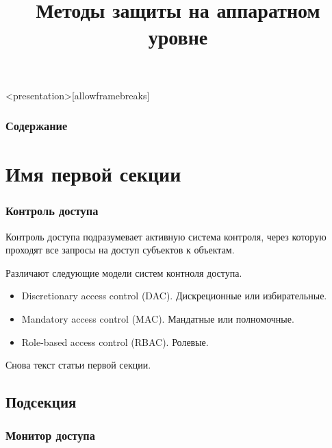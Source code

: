 
\title[Методы аппаратной защиты]{Методы защиты на аппаратном уровне}






\begin{frame}<presentation>[allowframebreaks]
\frametitle{Содержание}
\tableofcontents
\end{frame}


\section{Имя первой секции}



\begin{frame}
\frametitle{Контроль доступа}
\begin{definition}%
\alert{Контроль доступа} подразумевает активную система контроля, через которую проходят все запросы на доступ субъектов к объектам.
\end{definition}
Различают следующие модели систем контноля доступа.
\begin{itemize}
    \item Discretionary access control (DAC). Дискреционные или избирательные.
    \item Mandatory access control (MAC). Мандатные или полномочные.
    \item Role-based access control (RBAC). Ролевые. 
\end{itemize}
\end{frame}


Снова текст статьи первой секции.


\subsection[Кратко о подсекции]{Подсекция}


\begin{frame}
\frametitle{Монитор доступа}
\begin{figure}
    \begin{center}
    \end{center}
\end{figure} 
\end{frame}


